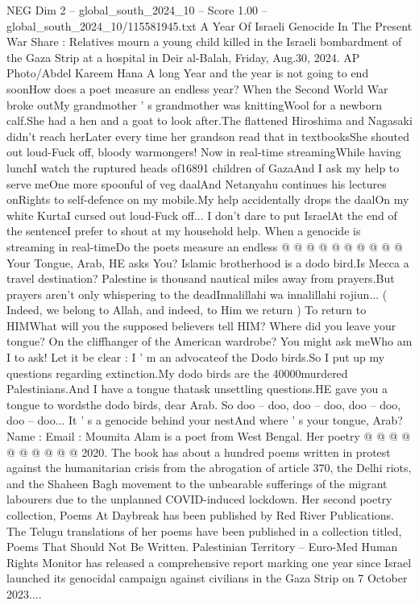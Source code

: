\begin{textsample}{NEG Dim 2 – global\_south\_2024\_10 – Score 1.00 – global\_south\_2024\_10/115581945.txt}  \label{ex:f2_neg_421}
A Year Of Israeli Genocide In The Present War Share : Relatives mourn a young child killed in the Israeli bombardment of the Gaza Strip at a hospital in Deir al-Balah, Friday, Aug.30, 2024.
AP Photo/Abdel Kareem Hana A long Year and the year is not going to end soonHow does a poet measure an endless year?
When the Second World War broke outMy grandmother ' s grandmother was knittingWool for a newborn calf.She had a hen and a goat to look after.The flattened Hiroshima and Nagasaki didn't reach herLater every time her grandson read that in textbooksShe shouted out loud-Fuck off, bloody warmongers!
Now in real-time streamingWhile having lunchI watch the ruptured heads of16891 children of GazaAnd I ask my help to serve meOne more spoonful of veg daalAnd Netanyahu continues his lectures onRights to self-defence on my mobile.My help accidentally drops the daalOn my white KurtaI cursed out loud-Fuck off...
I don't dare to put IsraelAt the end of the sentenceI prefer to shout at my household help.
When a genocide is streaming in real-timeDo the poets measure an endless @ @ @ @ @ @ @ @ @ @ Your Tongue, Arab, HE asks You?
Islamic brotherhood is a dodo bird.Is Mecca a travel destination?
Palestine is thousand nautical miles away from prayers.But prayers aren't only whispering to the deadInnalillahi wa innalillahi rojiun... ( Indeed, we belong to Allah, and indeed, to Him we return ) To return to HIMWhat will you the supposed believers tell HIM?
Where did you leave your tongue?
On the cliffhanger of the American wardrobe?
You might ask meWho am I to ask!
Let it be clear : I ' m an advocateof the Dodo birds.So I put up my questions regarding extinction.My dodo birds are the 40000murdered Palestinians.And I have a tongue thatask unsettling questions.HE gave you a tongue to wordsthe dodo birds, dear Arab.
So doo -- doo, doo -- doo, doo -- doo, doo -- doo...
It ' s a genocide behind your nestAnd where ' s your tongue, Arab?
Name : Email : Moumita Alam is a poet from West Bengal.
Her poetry @ @ @ @ @ @ @ @ @ @ 2020.
The book has about a hundred poems written in protest against the humanitarian crisis from the abrogation of article 370, the Delhi riots, and the Shaheen Bagh movement to the unbearable sufferings of the migrant labourers due to the unplanned COVID-induced lockdown.
Her second poetry collection, Poems At Daybreak has been published by Red River Publications.
The Telugu translations of her poems have been published in a collection titled, Poems That Should Not Be Written.
Palestinian Territory -- Euro-Med Human Rights Monitor has released a comprehensive report marking one year since Israel launched its genocidal campaign against civilians in the Gaza Strip on 7 October 2023....

\end{textsample}
